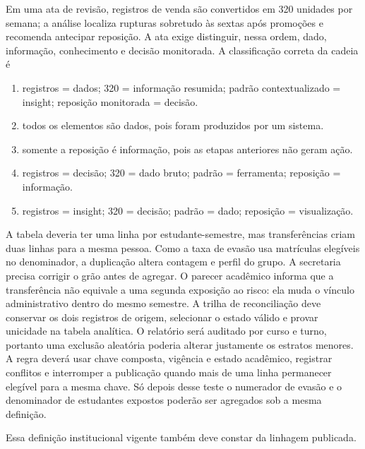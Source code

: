 \documentclass[12pt,a4paper]{article}
\begin{document}
\TextoBase Em uma ata de revisão, registros de venda são convertidos em 320 unidades por semana; a análise localiza rupturas sobretudo às sextas após promoções e recomenda antecipar reposição. A ata exige distinguir, nessa ordem, dado, informação, conhecimento e decisão monitorada.
\FonteDidatica
\Comando A classificação correta da cadeia é
\begin{enumerate}[label=\Alph*)]
  \item registros = dados; 320 = informação resumida; padrão contextualizado = insight; reposição monitorada = decisão.
  \item todos os elementos são dados, pois foram produzidos por um sistema.
  \item somente a reposição é informação, pois as etapas anteriores não geram ação.
  \item registros = decisão; 320 = dado bruto; padrão = ferramenta; reposição = informação.
  \item registros = insight; 320 = decisão; padrão = dado; reposição = visualização.
\end{enumerate}


\TextoBase

A tabela deveria ter uma linha por estudante-semestre, mas transferências criam duas linhas para a mesma pessoa. Como a taxa de evasão usa matrículas elegíveis no denominador, a duplicação altera contagem e perfil do grupo. A secretaria precisa corrigir o grão antes de agregar. O parecer acadêmico informa que a transferência não equivale a uma segunda exposição ao risco: ela muda o vínculo administrativo dentro do mesmo semestre. A trilha de reconciliação deve conservar os dois registros de origem, selecionar o estado válido e provar unicidade na tabela analítica. O relatório será auditado por curso e turno, portanto uma exclusão aleatória poderia alterar justamente os estratos menores. A regra deverá usar chave composta, vigência e estado acadêmico, registrar conflitos e interromper a publicação quando mais de uma linha permanecer elegível para a mesma chave. Só depois desse teste o numerador de evasão e o denominador de estudantes expostos poderão ser agregados sob a mesma definição.

Essa definição institucional vigente também deve constar da linhagem publicada.
\end{document}
